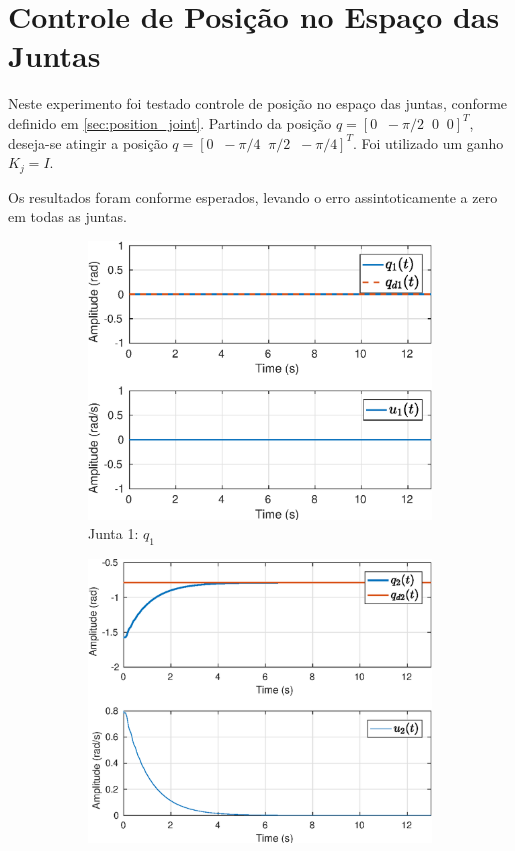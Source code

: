 	

\section{Controle de Posição no Espaço das Juntas}

Neste experimento foi testado controle de posição no espaço das juntas, conforme definido em \ref{sec:position_joint}. Partindo da posição ${q} =[ 0 \;\; -\pi/2 \;\; 0 \;\; 0]^T$, deseja-se atingir a posição ${q} =[ 0 \;\; -\pi/4 \;\; \pi/2  \;\; -\pi/4]^T$. Foi utilizado um ganho ${K}_j = {I}$.

Os resultados foram conforme esperados, levando o erro assintoticamente a zero em todas as juntas.

\begin{figure}[H]
\centering
\begin{subfigure}{.5\textwidth}
  \centering
  \includegraphics[width=\linewidth]{./img/joint_test1/q1.eps}
  \caption{Junta 1: $q_1$}
  \label{fig:sub1}
\end{subfigure}%
\begin{subfigure}{.5\textwidth}
  \centering
  \includegraphics[width=\linewidth]{./img/joint_test1/q2.eps}

\end{subfigure}
\end{figure}
